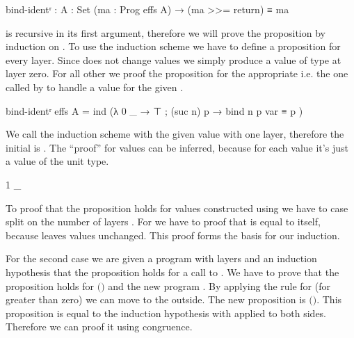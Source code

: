 \begin{AgdaAlign}
\begin{code}
bind-identʳ : {A : Set} (ma : Prog effs A) → (ma >>= return) ≡ ma
\end{code}
\AgdaFunction{>>=} is recursive in its first argument, therefore we will prove
the proposition by induction on .
To use the induction scheme we have to define a proposition for every layer.
Since \AgdaFunction{>>=} does not change values we simply produce a value of
type  at layer zero.
For all other we proof the proposition for the appropriate
 i.e. the one called by  to handle a value
for the given .

\begin{code}
bind-identʳ {effs} {A} = ind (λ{ 0 _ → ⊤ ; (suc n) p → bind n p var ≡ p })
\end{code}
We call the induction scheme with the given value with one layer, therefore the
initial  is .
The ``proof'' for values can be inferred, because for each value it's just a
value of the unit type.

\begin{code}
  1 _
\end{code}
To proof that the proposition holds for values constructed using
 we have to case split on the number of layers
.
For  we have to proof that
\AgdaSpace{} is equal to itself,
because \AgdaFunction{>>=} leaves values unchanged.
This proof forms the basis for our induction.

For the second case we are given a program  with
\AgdaSpace{} layers and an
induction hypothesis  that the proposition holds for a call to
\AgdaSpace{}.
We have to prove that the proposition holds for
\AgdaSpace{}$($\AgdaSpace{}$)$
and the new program \AgdaSpace{}.
By applying the \AgdaFunction{>>=} rule for  (for
 greater than zero) we can move 
to the outside.
The new proposition is
\AgdaSpace{}$($\AgdaSpace{}$)$\AgdaSpace{}\AgdaSpace{}\AgdaSpace{}.
This proposition is equal to the induction hypothesis with
 applied to both sides.
Therefore we can proof it using congruence.


\end{AgdaAlign}
